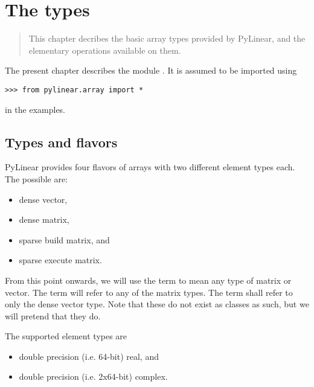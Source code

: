 \chapter{The  types}
\begin{quote}
   This chapter decribes the basic array types provided by PyLinear, and
   the elementary operations available on them.
\end{quote}

The present chapter describes the module . It is
assumed to be imported using
\begin{verbatim}
>>> from pylinear.array import *
\end{verbatim}
in the examples.

\section{Types and flavors}
\label{sec:types-and-flavors}
PyLinear provides four flavors of arrays with two different element
types each.  The possible  are:
\begin{itemize}
  \item dense vector,
  \item dense matrix,
  \item sparse build matrix, and
  \item sparse execute matrix.
\end{itemize}
From this point onwards, we will use the term 
to mean any type of matrix or vector. The term 
will refer to any of the matrix types. The term 
shall refer to only the dense vector type. Note that these do not exist as
classes as such, but we will pretend that they do.

The supported element types are
\begin{itemize}
  \item double precision (i.e. 64-bit) real, and
  \item double precision (i.e. 2x64-bit) complex.
\end{itemize}

